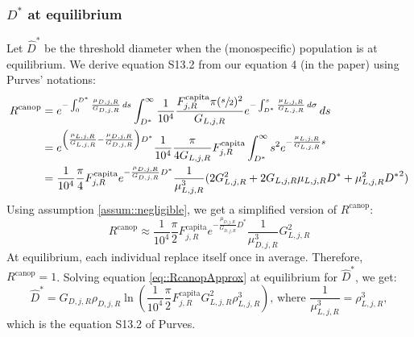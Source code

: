 \documentclass[letterpaper, 12pt]{article}
\theoremstyle{theo}
\begin{document}
\begin{refsection}
\begin{onehalfspace}
\subsubsection{$ D^{*} $ at equilibrium \citep[equation S13.2]{Purves2009}}
Let $ \hat D^{*} $ be the threshold diameter when the (monospecific) population is at equilibrium. We derive equation S13.2 \citep{Purves2009} from our equation 4 (in the paper) using Purves' notations:
\begin{align*}
	R^{\text{canop}} &= e^{-\int_{0}^{D^{*}} \frac{\mu_{D, j, R}}{G_{D, j, R}} \, ds} \int_{D^{*}}^{\infty} \frac{1}{10^4} \frac{F_{j, R}^{\text{capita}} \pi (\sfrac{s}{2})^2}{G_{L, j, R}} e^{-\int_{D^{*}}^{s} \frac{\mu_{L, j, R}}{G_{L, j, R}} \, d\sigma} \, ds \\
		&= e^{\left(\frac{\mu_{L, j, R}}{G_{L, j, R}} - \frac{\mu_{D, j, R}}{G_{D, j, R}} \right) D^{*}} \frac{1}{10^4} \frac{\pi}{4 G_{L, j, R}} F_{j, R}^{\text{capita}} \int_{D^{*}}^{\infty} s^2 e^{-\frac{\mu_{L, j, R}}{G_{L, j, R}} s} \\
		&= \frac{1}{10^4} \frac{\pi}{4} F_{j, R}^{\text{capita}} e^{- \frac{\mu_{D, j, R}}{G_{D, j, R}} D^{*}} \frac{1}{\mu_{L, j, R}^3} (2 G_{L, j, R}^2 + 2 G_{L, j, R} \mu_{L, j, R} D^{*} + \mu_{L, j, R}^2 {D^{*}}^2)
\end{align*}
Using assumption \ref{assum::negligible}, we get a simplified version of $ R^{\text{canop}} $:
\begin{equation} \label{eq::RcanopApprox}
	R^{\text{canop}} \approx \frac{1}{10^4} \frac{\pi}{2} F_{j, R}^{\text{capita}} e^{- \frac{\mu_{D, j, R}}{G_{D, j, R}} D^{*}} \frac{1}{\mu_{D, j, R}^3} G_{L, j, R}^2
\end{equation}
At equilibrium, each individual replace itself once in average. Therefore, $ R^{\text{canop}} = 1 $. Solving equation \eqref{eq::RcanopApprox} at equilibrium for $ \hat D^{*} $, we get:
\[
	\hat D^{*} = G_{D, j, R} \rho_{D, j, R} \ln \left( \frac{1}{10^4} \frac{\pi}{2} F_{j, R}^{\text{capita}} G_{L, j, R}^2 \rho_{L, j, R}^3 \right) \text{, where } \frac{1}{\mu_{L, j, R}^3} = \rho_{L, j, R}^3,
\]
which is the equation S13.2 of Purves.
\end{onehalfspace}

\printbibliography[heading=subbibliography]
\end{refsection}
\end{document}
